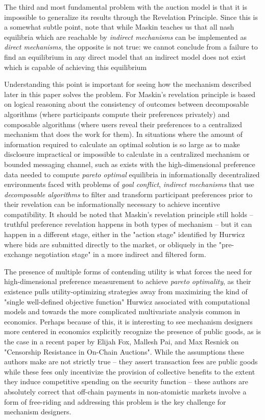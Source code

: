 The third and most fundamental problem with the auction model is that it is impossible to generalize its results through the Revelation Principle. Since this is a somewhat subtle point, note that while Maskin teaches us that all nash equilibria which are reachable by \textit{indirect mechanisms} can be implemented as \textit{direct mechanisms}, the opposite is not true: we cannot conclude from a failure to find an equilibrium in any direct model that an indirect model does not exist which is capable of achieving this equilibrium

Understanding this point is important for seeing how the mechanism described later in this paper solves the problem. For Maskin's revelation principle is based on logical reasoning about the consistency of outcomes between decomposable algorithms (where participants compute their preferences privately) and composable algorithms (where users reveal their preferences to a centralized mechanism that does the work for them). In situations where the amount of information required to calculate an optimal solution is so large as to make disclosure impractical or impossible to calculate in a centralized mechanism or bounded messaging channel, such as exists with the high-dimensional preference data needed to compute \textit{pareto optimal} equilibria in informationally decentralized environments faced with problems of \textit{goal conflict}, \textit{indirect mechanisms} that use \textit{decomposable algorithms} to filter and transform participant preferences prior to their revelation can be informationally necessary to achieve incentive compatibility. It should be noted that Maskin's revelation principle still holds -- truthful preference revelation happens in both types of mechanism -- but it can happen in a different stage, either in the "action stage" identified by Hurwicz where bids are submitted directly to the market, or obliquely in the "pre-exchange negotiation stage" in a more indirect and filtered form.

The presence of multiple forms of contending utility is what forces the need for high-dimensional preference measurement to achieve \textit{pareto optimality}, as their existence pulls utility-optimizing strategies away from maximizing the kind of "single well-defined objective function" Hurwicz associated with computational models and towards the more complicated multivariate analysis common in economics. Perhaps because of this, it is interesting to see mechanism designers more centered in economics explicitly recognize the presence of public goods, as is the case in a recent paper by Elijah Fox, Mallesh Pai, and Max Resnick on "Censorship Resistance in On-Chain Auctions". While the assumptions these authors make are not strictly true -- they assert transaction fees are public goods while these fees only incentivize the provision of collective benefits to the extent they induce competitive spending on the security function -- these authors are absolutely correct that off-chain payments in non-atomistic markets involve a form of free-riding and addressing this problem is the key challenge for mechanism designers.

